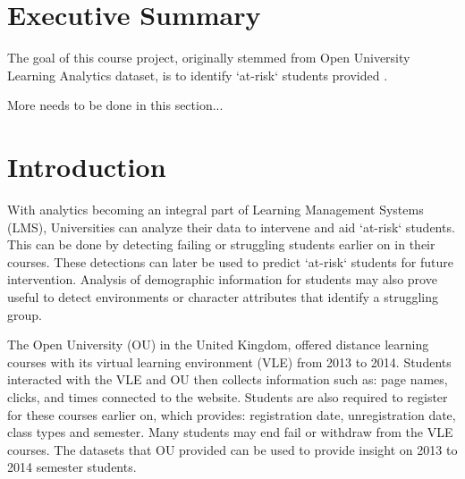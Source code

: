 \documentclass[12pt]{article}
\begin{document}

\tableofcontents
\pagebreak


\section{Executive Summary}

The goal of this course project, originally stemmed from Open University Learning Analytics dataset, is to identify `at-risk` students 
provided \cite{oulad}.

More needs to be done in this section...

%
%

\section{Introduction}

With analytics becoming an integral part of Learning Management Systems (LMS), Universities can analyze their data to intervene and aid `at-risk` 
students. This can be done by detecting failing or struggling students earlier on in their courses. These detections can later be used to predict `at-risk`
students for future intervention. Analysis of demographic information for students may also prove useful to detect environments or character
attributes that identify a struggling group.

The Open University (OU) in the United Kingdom, offered distance learning courses with its virtual learning environment (VLE) from 2013 to 2014. Students interacted with 
the VLE and OU then collects information such as: page names, clicks, and times connected to the website. Students are also required to register for these 
courses earlier on, which provides: registration date, unregistration date, class types and semester. Many students may end fail or withdraw from the VLE 
courses. The datasets that OU provided can be used to provide insight on 2013 to 2014 semester students. 
\end{document}
